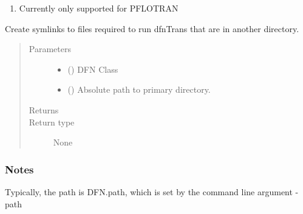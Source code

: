 \documentclass[letterpaper,10pt,english]{sphinxmanual}
\begin{document}
\begin{fulllineitems}
\begin{fulllineitems}
\begin{enumerate}
\item {} 
Currently only supported for PFLOTRAN

\end{enumerate}

\end{fulllineitems}


\begin{fulllineitems}
\label{\detokenize{pydfnworks:pydfnworks.general.dfnworks.DFNWORKS.create_dfn_trans_links}}
Create symlinks to files required to run dfnTrans that are in another directory.
\begin{quote}\begin{description}
\item[{Parameters}] \leavevmode\begin{itemize}
\item {} 
 () \textendash{} DFN Class

\item {} 
 () \textendash{} Absolute path to primary directory.

\end{itemize}

\item[{Returns}] \leavevmode


\item[{Return type}] \leavevmode
None

\end{description}\end{quote}
\subsubsection*{Notes}

Typically, the path is DFN.path, which is set by the command line argument -path

\end{fulllineitems}



\end{fulllineitems}
\end{document}
